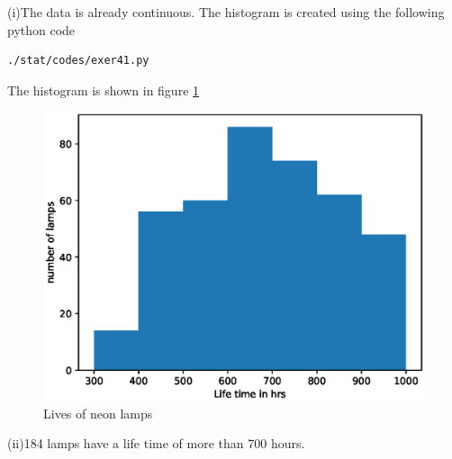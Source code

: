 (i)The data is already continuous. The histogram is created using the following python code\\
\begin{lstlisting}
./stat/codes/exer41.py
\end{lstlisting}
The histogram is shown in figure \ref{fig:hist41_py}
\begin{figure}[!ht]
\centering
\includegraphics[width=\columnwidth]{./stat/codes/pyfigs/exer41.eps}
\caption{Lives of neon lamps}
\label{fig:hist41_py}
\end{figure}
(ii)184 lamps have a life time of more than 700 hours.
